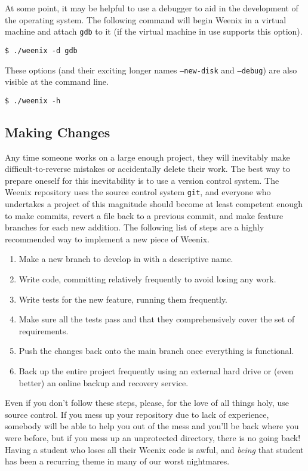 At some point, it may be helpful to use a debugger to aid in the development of the operating system. The following command will begin Weenix in a virtual machine and attach \texttt{gdb} to it (if the virtual machine in use supports this option).
\begin{verbatim}
$ ./weenix -d gdb\end{verbatim}


These options (and their exciting longer names \texttt{--new-disk} and \texttt{--debug}) are also visible at the command line.
\begin{verbatim}
$ ./weenix -h\end{verbatim}

\subsection{Making Changes}
Any time someone works on a large enough project, they will inevitably make difficult-to-reverse mistakes or accidentally delete their work. The best way to prepare oneself for this inevitability is to use a version control system. The Weenix repository uses the source control system \texttt{git}, and everyone who undertakes a project of this magnitude should become at least competent enough to make commits, revert a file back to a previous commit, and make feature branches for each new addition. The following list of steps are a highly recommended way to implement a new piece of Weenix.
\begin{enumerate}
    \item Make a new branch to develop in with a descriptive name.
    \item Write code, committing relatively frequently to avoid losing any work.
    \item Write tests for the new feature, running them frequently.
    \item Make sure all the tests pass and that they comprehensively cover the set of requirements.
    \item Push the changes back onto the main branch once everything is functional.
    \item Back up the entire project frequently using an external hard drive or (even better) an online backup and recovery service.
\end{enumerate}

Even if you don't follow these steps, please, for the love of all things holy, use source control. If you mess up your repository due to lack of experience, somebody will be able to help you out of the mess and you'll be back where you were before, but if you mess up an unprotected directory, there is no going back! Having a student who loses all their Weenix code is awful, and \emph{being} that student has been a recurring theme in many of our worst nightmares.
 

